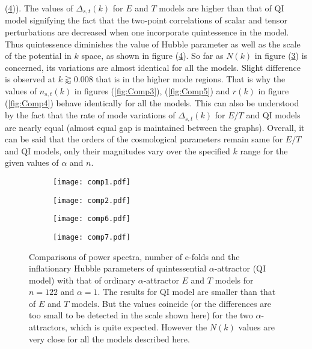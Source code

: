 \documentclass[a4paper,11pt]{article}
\begin{document}
(\ref{fig:Comp7})). The values of $\Delta_{s,t}(k)$ for $E$ and $T$ models are higher than that of QI model signifying the fact that the two-point correlations of scalar and tensor perturbations are decreased when one incorporate quintessence in the model. Thus quintessence diminishes the value of Hubble parameter as well as the scale of the potential in $k$ space, as shown in figure (\ref{fig:Comp7}). So far as $N(k)$ in figure (\ref{fig:Comp6}) is concerned, its variations are almost identical for all the models. Slight difference is observed at $k\gtrapprox 0.008$ that is in the higher mode regions. That is why the values of $n_{s,t}(k)$ in figures (\ref{fig:Comp3}), (\ref{fig:Comp5}) and $r(k)$ in figure (\ref{fig:Comp4}) behave identically for all the models. This can also be understood by the fact that the rate of mode variations of $\Delta_{s,t}(k)$ for $E/T$ and QI models are nearly equal (almost equal gap is maintained between the graphs). Overall, it can be said that the orders of the cosmological parameters remain same for $E/T$ and QI models, only their magnitudes vary over the specified $k$ range for the given values of $\alpha$ and $n$.
\begin{figure}[H]
\begin{subfigure}{0.52\linewidth}
  \centering
   \texttt{[image: comp1.pdf]} 
   \subcaption{}
   \label{fig:Comp1}
\end{subfigure}%
\begin{subfigure}{0.52\linewidth}
  \centering
   \texttt{[image: comp2.pdf]}
   \subcaption{}
   \label{fig:Comp2}
\end{subfigure}%
\vspace{0.1\linewidth}
\begin{subfigure}{0.52\linewidth}
  \centering
   \texttt{[image: comp6.pdf]}
   \subcaption{}
    \label{fig:Comp6}
\end{subfigure}%
\begin{subfigure}{0.52\linewidth}
  \centering
   \texttt{[image: comp7.pdf]}
   \subcaption{}
    \label{fig:Comp7}
\end{subfigure}
\caption{Comparisons of power spectra, number of e-folds and the inflationary Hubble parameters of quintessential $\alpha$-attractor (QI model) with that of ordinary $\alpha$-attractor $E$ and $T$ models for $n=122$ and $\alpha=1$. The results for QI model are smaller than that of $E$ and $T$ models. But the values coincide (or the differences are too small to be detected in the scale shown here) for the two $\alpha$-attractors, which is quite expected. However the $N(k)$ values are very close for all the models described here.}
\label{fig:CompAlphaData1}
\end{figure}
\end{document}
